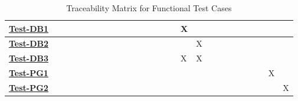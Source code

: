 \documentclass[12pt, titlepage]{article}
\begin{document}
\begin{landscape}
\begin{table}[H]
\begin{adjustwidth}{-0.0in}{-1in}
{\begin{tabular}{l|l|l|l|l|l|l|l|l|l|l|l|l|l|l|l|l|l|l|l|l|l|l|l|l|l|l|}
\multicolumn{1}{|l|}{\hyperref[Test-DB1]{\textbf{Test-DB1}}}  &              &              &              &              &              &              &              &              &              &               &               &               &               &               &               & X             &               &               &               &               &               &               &             &             &             &             \\ \hline
\multicolumn{1}{|l|}{\hyperref[Test-DB2]{\textbf{Test-DB2}}}  &              &              &              &              &              &              &              &              &              &               &               &               &               &               &               &               & X             &               &               &               &               &               &             &             &             &             \\ \hline
\multicolumn{1}{|l|}{\hyperref[Test-DB3]{\textbf{Test-DB3}}}  &              &              &              &              &              &              &              &              &              &               &               &               &               &               &               & X             & X             &               &               &               &               &               &             &             &             &             \\ \hline
\multicolumn{1}{|l|}{\hyperref[Test-PG1]{\textbf{Test-PG1}}}  &              &              &              &              &              &              &              &              &              &               &               &               &               &               &               &               &               &               &               &               &               &               &             &             & X           &             \\ \hline
\multicolumn{1}{|l|}{\hyperref[Test-PG2]{\textbf{Test-PG2}}}  &              &              &              &              &              &              &              &              &              &               &               &               &               &               &               &               &               &               &               &               &               &               &             &             &             & X           \\ \hline
\end{tabular}
}
\caption{Traceability Matrix for Functional Test Cases}
    \label{tab:my_label}
\end{adjustwidth}
\end{table}
\vfill
\raisebox{0.5pt}{\makebox[\linewidth]{\thepage}}
\end{landscape}
\end{document}

